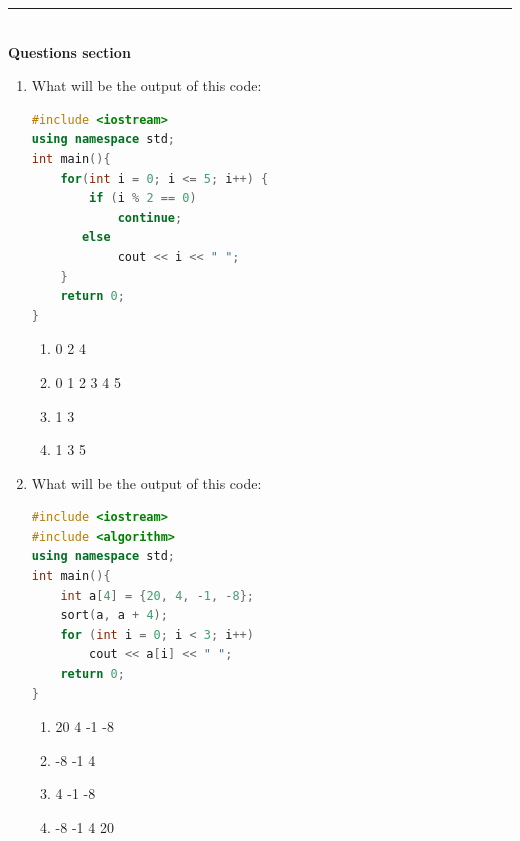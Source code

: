 \documentclass[10pt]{article}
\begin{document}
\medskip\hrule
\textbf{
\\
{Questions section}\\
}
\begin{enumerate}


\item What will be the output of this code:
\begin{lstlisting}[language=C++]
#include <iostream>
using namespace std;
int main(){
    for(int i = 0; i <= 5; i++) {
        if (i % 2 == 0)
            continue;
       else
            cout << i << " ";
   	}
    return 0;
}
\end{lstlisting}
\begin{multicols}{4}
\begin{enumerate}
    \item 0 2 4 
    \item 0 1 2 3 4 5 
    \item 1 3
    \item 1 3 5 
\end{enumerate}
\end{multicols}











\item What will be the output of this code:
\begin{lstlisting}[language=C++]
#include <iostream>
#include <algorithm>
using namespace std;
int main(){
    int a[4] = {20, 4, -1, -8};
    sort(a, a + 4);
    for (int i = 0; i < 3; i++)
        cout << a[i] << " ";
    return 0;
}
\end{lstlisting}
\begin{multicols}{4}
\begin{enumerate}
    \item 20 4 -1 -8 
    \item  -8 -1 4
    \item 4 -1 -8
    \item -8 -1 4 20 
\end{enumerate}
\end{multicols}









\end{enumerate}
\end{document}
